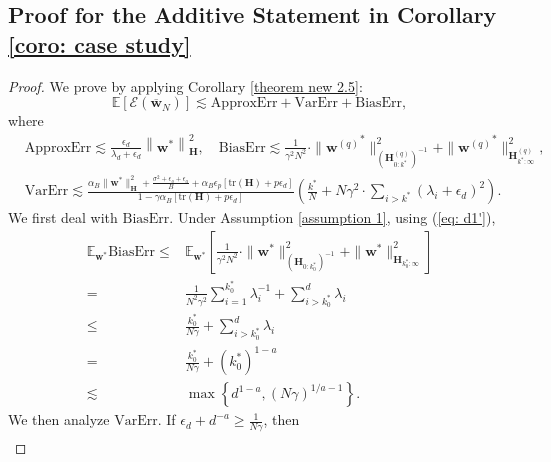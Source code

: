 \documentclass[11pt, letterpaper]{article}
\begin{document}
\subsection{Proof for the Additive Statement in Corollary \ref{coro: case study}}
\begin{proof}
    We prove by applying Corollary \ref{theorem new 2.5}:
    \begin{equation*}
        \mathbb{E}[\mathcal{E}(\overline{\mathbf{w}}_N)] \lesssim \mathrm{ApproxErr}+\mathrm{ VarErr}+\mathrm{BiasErr},
    \end{equation*}
    where
    \begin{align*}
            &\mathrm{ApproxErr}\lesssim \frac{\epsilon_d}{\lambda_d+\epsilon_d}\left\|\mathbf{w}^*\right\|_\mathbf{H}^2,\quad \mathrm{BiasErr}\lesssim\frac{1}{\gamma^2N^2}\cdot\|{\mathbf{w}^{(q)}}^*\|_{(\mathbf{H}_{0:k^*}^{(q)})^{-1}}^2+\|{\mathbf{w}^{(q)}}^*\|_{\mathbf{H}_{k^*:\infty}^{(q)}}^2,\\
            &\mathrm{VarErr}\lesssim \frac{\alpha_B\|\mathbf{w}^*\|_\mathbf{H}^2+\frac{\sigma^2+\epsilon_o+\epsilon_a}{B}+\alpha_B \epsilon_p[\mathrm{tr}(\mathbf{H})+p\epsilon_d]}{1-\gamma\alpha_B[\mathrm{tr}(\mathbf{H})+p\epsilon_d]}\left(\frac{k^*}{N}+N\gamma^2\cdot\sum_{i>k^*}(\lambda_i+\epsilon_d)^2\right).
    \end{align*}
    We first deal with $\mathrm{BiasErr}$.
    Under Assumption \ref{assumption 1}, using (\ref{eq: d1'}),
    \begin{equation}
        \label{eq: d6}
        \begin{aligned}
            \mathbb{E}_{\mathbf{w}^*}\mathrm{BiasErr}\leq&
            \mathbb{E}_{\mathbf{w}^*}\left[\frac{1}{\gamma^2N^2}\cdot\|{\mathbf{w}}^*\|_{(\mathbf{H}_{0:k_0^*})^{-1}}^2+\|{\mathbf{w}}^*\|_{\mathbf{H}_{k_0^*:\infty}}^2\right]\\
            =&\frac{1}{N^2\gamma^2}\sum_{i=1}^{k_0^*}\lambda_i^{-1}+\sum_{i>k_0^*}^{d}\lambda_i\\
            \leq& \frac{k_0^*}{N\gamma}+\sum_{i>k_0^*}^{d}\lambda_i\\
            =&\frac{k_0^*}{N\gamma}+(k_0^*)^{1-a}\\
            \lesssim&\max\left\{d^{1-a},(N\gamma)^{1/a-1}\right\}.
        \end{aligned}
    \end{equation}
    We then analyze $\mathrm{VarErr}$. If $\epsilon_d+d^{-a}\geq \frac{1}{N\gamma}$, then
    \begin{equation*}
        \begin{aligned}

\end{aligned}
\end{equation*}
\end{proof}
\end{document}
